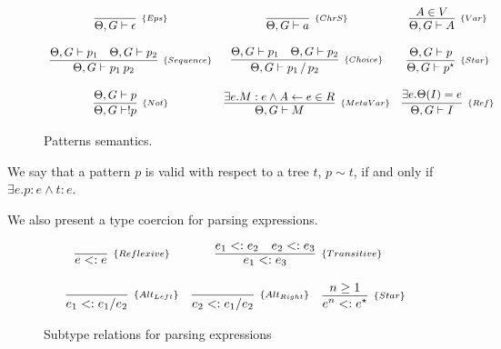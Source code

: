 \begin{figure*}[!ht]
    \[
        \begin{array}{ccc}
            \infer[_{\{Eps\}}]{\Theta, G \vdash \epsilon}{} &
            \infer[_{\{ChrS\}}]{\Theta, G \vdash a}{} &
            \infer[_{\{Var\}}]{\Theta, G \vdash A}{A \in V}
            \\ \\
            \infer[_{\{Sequence\}}]{\Theta, G \vdash p_1\:p_2}{\Theta, G \vdash p_1 & \Theta, G \vdash p_2} &
            \infer[_{\{Choice\}}]{\Theta, G \vdash p_1 \,/\, p_2}{\Theta, G \vdash p_1 & \Theta, G \vdash p_2} &
            \infer[_{\{Star\}}]{\Theta, G \vdash p^\star}{\Theta, G \vdash p}
            \\ \\
            \infer[_{\{Not\}}]{\Theta, G \vdash !p}{\Theta, G \vdash p} &
            \infer[_{\{MetaVar\}}]{\Theta, G \vdash M}{\exists e. M : e \land A \leftarrow e \in R} &
            \infer[_{\{Ref\}}]{\Theta, G \vdash I}{\exists e. \Theta(I) = e}
        \end{array}
    \]
    \centering
    \caption{Patterns semantics.}
    \label{fig:pattern-semantics}
\end{figure*}

\begin{definition}
    We say that a pattern \(p\) is valid with respect to a tree \(t\), \(p \sim t\),
    if and only if \(\exists e . p : e \land t : e\).
\end{definition}

We also present a type coercion for parsing expressions.
\begin{figure*}[ht]
    \[
        \begin{array}{ccc}
            \infer[_{\{Reflexive\}}]{e <: e}{} &
            \multicolumn{2}{c}{
                \infer[_{\{Transitive\}}]{e_1 <: e_3}{e_1 <: e_2 & e_2 <: e_3}
            } \\ \\

            \infer[_{\{Alt_{Left}\}}]{e_1 <: e_1 / e_2}{} &
            \infer[_{\{Alt_{Right}\}}]{e_2 <: e_1 / e_2}{} &
            \infer[_{\{Star\}}]{e^n <: e^\star}{n \geq 1}
        \end{array}
    \]
    \centering
    \caption{Subtype relations for parsing expressions}
    \label{fig:subtype-relations}
\end{figure*}

